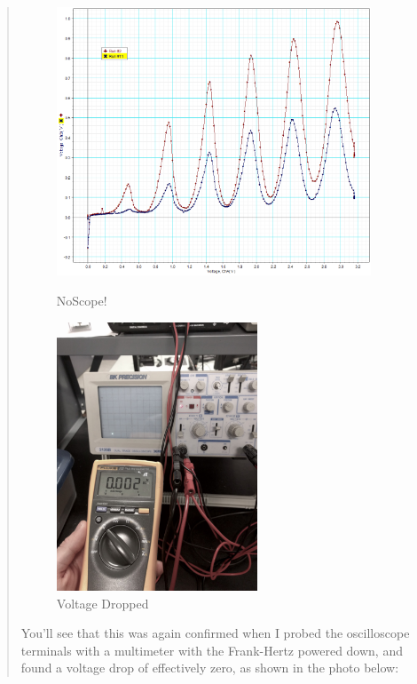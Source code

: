 \documentclass{amsart}
\begin{document}
\begin{enumerate}
{\begin{quote}
\begin{figure}[H]
    \begin{minipage}{0.6\textwidth}
        \includegraphics[height=8cm]{scopeoff.png}
        \caption{NoScope!}
    \end{minipage}
    \begin{minipage}{0.37\textwidth}
        \includegraphics[height=8cm]{voltagedrop.jpg}
        \caption{Voltage Dropped}
    \end{minipage}
\end{figure}

You'll see that this was again confirmed when I probed the oscilloscope terminals with a multimeter with the Frank-Hertz powered down, and found a voltage drop of effectively zero, as shown in the photo below:

\begin{figure}[H]

\end{figure}

\end{quote}}
\end{enumerate}
\end{document}
